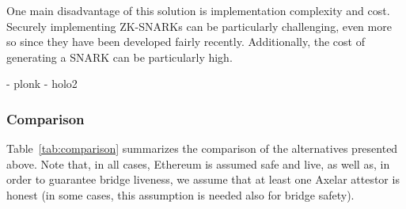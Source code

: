One main disadvantage of this solution is implementation complexity and cost.
Securely implementing ZK-SNARKs can be particularly challenging, even more so
since they have been developed fairly recently. Additionally, the cost of
generating a SNARK can be particularly high.

- plonk
- holo2

\subsubsection{Comparison}

Table~\ref{tab:comparison} summarizes the comparison of the alternatives
presented above. Note that, in all cases, Ethereum is assumed safe and live, as
well as, in order to guarantee bridge liveness, we assume that at least one
Axelar attestor is honest (in some cases, this assumption is needed also for
bridge safety).

